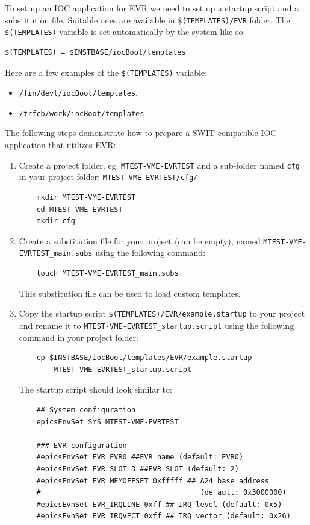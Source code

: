\documentclass[12pt,a4paper]{article}
\begin{document}
To set up an IOC application for EVR we need to set up a startup script and a substitution file. Suitable ones are available in \texttt{\$(TEMPLATES)/EVR} folder. The \texttt{\$(TEMPLATES)} variable is set automatically by the system like so: 
\begin{verbatim}
$(TEMPLATES) = $INSTBASE/iocBoot/templates
\end{verbatim}
Here are a few examples of the \texttt{\$(TEMPLATES)} variable:
\begin{itemize}
\item \texttt{/fin/devl/iocBoot/templates}.
\item \texttt{/trfcb/work/iocBoot/templates}
\end{itemize}
The following steps demonstrate how to prepare a SWIT compatible IOC application that utilizes EVR:
\begin{enumerate}

	\item Create a project folder, eg. \texttt{MTEST-VME-EVRTEST} and a sub-folder named \texttt{cfg} in your project folder: \texttt{MTEST-VME-EVRTEST/cfg/}
\begin{verbatim}
	mkdir MTEST-VME-EVRTEST
	cd MTEST-VME-EVRTEST
	mkdir cfg
\end{verbatim}

	\item Create a substitution file for your project (can be empty), named \texttt{MTEST-VME-EVRTEST\_main.subs} using the following command: 
\begin{verbatim}
	touch MTEST-VME-EVRTEST_main.subs
\end{verbatim}	
	This substitution file can be used to load custom templates. %
	
	\item Copy the startup script \newline \texttt{\$(TEMPLATES)/EVR/example.startup} to your project and rename it to \texttt{MTEST-VME-EVRTEST\_startup.script} using the following command in your project folder:
\begin{verbatim}
	cp $INSTBASE/iocBoot/templates/EVR/example.startup 
	    MTEST-VME-EVRTEST_startup.script
\end{verbatim}

	The startup script should look similar to:
\begin{verbatim}
	## System configuration
	epicsEnvSet SYS MTEST-VME-EVRTEST
	
	### EVR configuration
	#epicsEnvSet EVR EVR0 ##EVR name (default: EVR0)
	#epicsEnvSet EVR_SLOT 3 ##EVR SLOT (default: 2)
	#epicsEnvSet EVR_MEMOFFSET 0xfffff ## A24 base address
	#                                     (default: 0x3000000)
	#epicsEvnSet EVR_IRQLINE 0xff ## IRQ level (default: 0x5)
	#epicsEvnSet EVR_IRQVECT 0xff ## IRQ vector (default: 0x26)
	

\end{verbatim}
\end{enumerate}
\end{document}
